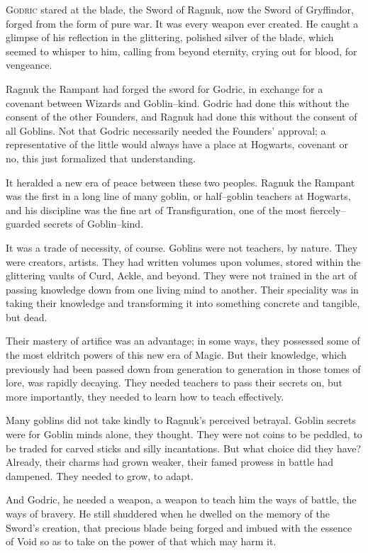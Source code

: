 \lettrine{G}{odric} stared at the blade, the Sword of Ragnuk, now the Sword of Gryffindor, forged from the form of pure war. It was every weapon ever created. He caught a glimpse of his reflection in the glittering, polished silver of the blade, which seemed to whisper to him, calling from beyond eternity, crying out for blood, for vengeance.

Ragnuk the Rampant had forged the sword for Godric, in exchange for a covenant between Wizards and Goblin\mbox{--}kind. Godric had done this without the consent of the other Founders, and Ragnuk had done this without the consent of all Goblins. Not that Godric necessarily needed the Founders’ approval; a representative of the little would always have a place at Hogwarts, covenant or no, this just formalized that understanding.

It heralded a new era of peace between these two peoples. Ragnuk the Rampant was the first in a long line of many goblin, or half\mbox{--}goblin teachers at Hogwarts, and his discipline was the fine art of Transfiguration, one of the most fiercely\mbox{--}guarded secrets of Goblin\mbox{--}kind.

It was a trade of necessity, of course. Goblins were not teachers, by nature. They were creators, artists. They had written volumes upon volumes, stored within the glittering vaults of Curd, Ackle, and beyond. They were not trained in the art of passing knowledge down from one living mind to another. Their speciality was in taking their knowledge and transforming it into something concrete and tangible, but dead.

Their mastery of artifice was an advantage; in some ways, they possessed some of the most eldritch powers of this new era of Magic. But their knowledge, which previously had been passed down from generation to generation in those tomes of lore, was rapidly decaying. They needed teachers to pass their secrets on, but more importantly, they needed to learn how to teach effectively.

Many goblins did not take kindly to Ragnuk’s perceived betrayal. Goblin secrets were for Goblin minds alone, they thought. They were not coins to be peddled, to be traded for carved sticks and silly incantations. But what choice did they have? Already, their charms had grown weaker, their famed prowess in battle had dampened. They needed to grow, to adapt.

And Godric, he needed a weapon, a weapon to teach him the ways of battle, the ways of bravery. He still shuddered when he dwelled on the memory of the Sword’s creation, that precious blade being forged and imbued with the essence of Void so as to take on the power of that which may harm it.


